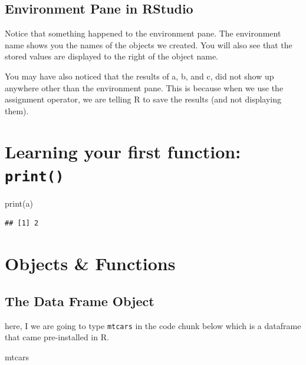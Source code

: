 \documentclass[
]{book}
\newenvironment{Shaded}{\begin{snugshade}}{\end{snugshade}}
\newcommand{\FunctionTok}[1]{\textcolor[rgb]{0.00,0.00,0.00}{#1}}
\newcommand{\NormalTok}[1]{#1}
\begin{document}
\hypertarget{environment-pane-in-rstudio}{%
\subsection{Environment Pane in RStudio}\label{environment-pane-in-rstudio}}

Notice that something happened to the environment pane. The environment name shows you the names of the objects we created. You will also see that the stored values are displayed to the right of the object name.

You may have also noticed that the results of a, b, and c, did not show up anywhere other than the environment pane. This is because when we use the assignment operator, we are telling R to save the results (and not displaying them).

\hypertarget{learning-your-first-function-print}{%
\section{\texorpdfstring{Learning your first function: \texttt{print()}}{Learning your first function: print()}}\label{learning-your-first-function-print}}

\begin{Shaded}
\begin{Highlighting}[]
\FunctionTok{print}\NormalTok{(a)}
\end{Highlighting}
\end{Shaded}

\begin{verbatim}
## [1] 2
\end{verbatim}

\hypertarget{objects-functions}{%
\section{Objects \& Functions}\label{objects-functions}}

\hypertarget{the-data-frame-object}{%
\subsection{The Data Frame Object}\label{the-data-frame-object}}

here, I we are going to type \texttt{mtcars} in the code chunk below which is a dataframe that came pre-installed in R.

\begin{Shaded}
\begin{Highlighting}[]
\NormalTok{mtcars}
\end{Highlighting}
\end{Shaded}
\end{document}
